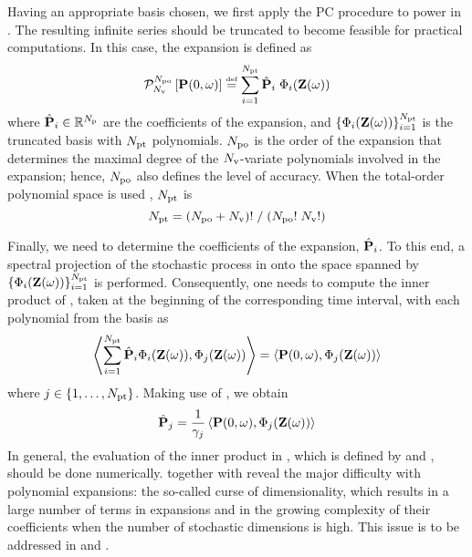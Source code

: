 Having an appropriate basis chosen, we first apply the PC procedure to power in . The resulting infinite series should be truncated to become feasible for practical computations. In this case, the expansion is defined as
\begin{equation} \elabel{pc-expansion}
  \oPC{\vars}{\pcorder}{\vP(0, \o)} \eqdef \sum_{i = 1}^{\pcterms} \pcc{\vP}_i \; \pcb_i(\vZ(\o))
\end{equation}
where $\hat{\mathbf{P}}_i \in \mathbb{R}^{N_\text{p}}$ are the coefficients of the expansion, and $\{ \Phi_i(\mathbf{Z}(\omega)) \}_{i = 1}^{{N_\text{pt}}}$ is the truncated basis with ${N_\text{pt}}$ polynomials. ${N_\text{po}}$ is the order of the expansion that determines the maximal degree of the ${N_\text{v}}$-variate polynomials involved in the expansion; hence, ${N_\text{po}}$ also defines the level of accuracy. When the total-order polynomial space is used \cite{beck2011}, ${N_\text{pt}}$ is
\begin{equation} \elabel{pc-terms}
  \pcterms = {(\pcorder + \vars)!} \; / \; {(\pcorder! \; \vars!)}
\end{equation}

Finally, we need to determine the coefficients of the expansion, $\hat{\mathbf{P}}_i$. To this end, a spectral projection of the stochastic process in  onto the space spanned by $\{ \Phi_i(\mathbf{Z}(\omega)) \}_{i = 1}^{{N_\text{pt}}}$ is performed. Consequently, one needs to compute the inner product of , taken at the beginning of the corresponding time interval, with each polynomial from the basis as
\[
  \oInner{\sum_{i=1}^{\pcterms} \pcc{\vP}_i \pcb_i(\vZ(\o))}{\pcb_j(\vZ(\o))} = \oInner{\vP(0, \o)}{\pcb_j(\vZ(\o))}
\]
where $j \in \{ 1, \dotsc, {N_\text{pt}} \}$. Making use of , we obtain
\begin{equation} \elabel{pc-coefficients}
  \pcc{\vP}_j = \frac{1}{\pcn_j} \oInner{\vP(0, \o)}{\pcb_j(\vZ(\o))}
\end{equation}
In general, the evaluation of the inner product in , which is defined by  and , should be done numerically.  together with  reveal the major difficulty with polynomial expansions: the so-called curse of dimensionality, which results in a large number of terms in expansions and in the growing complexity of their coefficients when the number of stochastic dimensions is high. This issue is to be addressed in  and .

